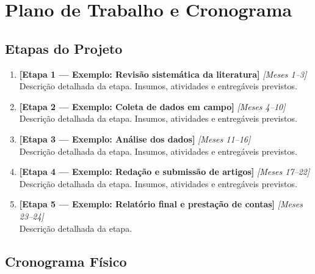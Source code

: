 \documentclass[
  12pt,
  a4paper,
  oneside,
  english,      %
  brazil
]{article}
\begin{document}
\section{Plano de Trabalho e Cronograma}
\label{sec:cronograma}

\subsection{Etapas do Projeto}

\begin{enumerate}
  \item \textbf{[Etapa 1 — Exemplo: Revisão sistemática da literatura]}
        \hfill \textit{[Meses 1–3]} \\
        Descrição detalhada da etapa. Insumos, atividades e entregáveis
        previstos.

  \item \textbf{[Etapa 2 — Exemplo: Coleta de dados em campo]}
        \hfill \textit{[Meses 4–10]} \\
        Descrição detalhada da etapa. Insumos, atividades e entregáveis
        previstos.

  \item \textbf{[Etapa 3 — Exemplo: Análise dos dados]}
        \hfill \textit{[Meses 11–16]} \\
        Descrição detalhada da etapa. Insumos, atividades e entregáveis
        previstos.

  \item \textbf{[Etapa 4 — Exemplo: Redação e submissão de artigos]}
        \hfill \textit{[Meses 17–22]} \\
        Descrição detalhada da etapa. Insumos, atividades e entregáveis
        previstos.

  \item \textbf{[Etapa 5 — Exemplo: Relatório final e prestação de contas]}
        \hfill \textit{[Meses 23–24]} \\
        Descrição detalhada da etapa.
\end{enumerate}

\subsection{Cronograma Físico}
\end{document}
